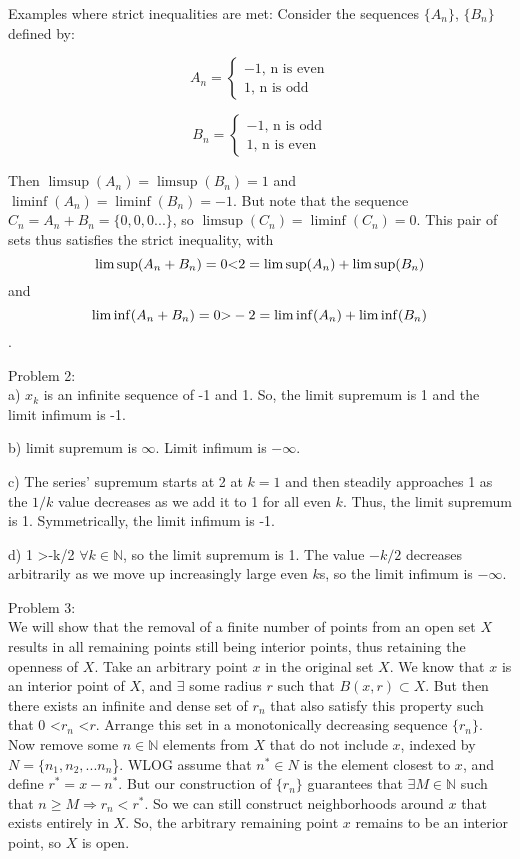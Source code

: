 \documentclass[12pt,leqno]{article}
\begin{document}
\bigskip
Examples where strict inequalities are met: Consider the sequences $\{A_n\}$, $\{B_n\}$ defined by:

$$A_n = \begin{cases}
	-1 \text{, n is even} \\
	1 \text{, n is odd}
\end{cases}$$

$$B_n = \begin{cases}
	-1 \text{, n is odd} \\
	1 \text{, n is even}
\end{cases}$$

Then $\limsup(A_n) = \limsup(B_n) = 1$ and $\liminf(A_n) = \liminf(B_n) = -1$. But note that the sequence $C_n = A_n + B_n = \{0, 0, 0 . . .\}$, so $\limsup(C_n) = \liminf(C_n) = 0$. This pair of sets thus satisfies the strict inequality, with 
$$\limsup(A_n + B_n) = 0 \text{\textless} 2 =  \limsup(A_n) + \limsup(B_n)$$
and
$$\liminf(A_n + B_n) = 0 \text{\textgreater} -2 =  \liminf(A_n) + \liminf(B_n)$$.

\bigskip
\noindent Problem 2:\\
\indent a) $x_k$ is an infinite sequence of -1 and 1. So, the limit supremum is 1 and the limit infimum is -1.

\smallskip
\indent b) limit supremum is $\infty$. Limit infimum is $-\infty$.

\smallskip
\indent c) The series' supremum starts at 2 at $k=1$ and then steadily approaches 1 as the $1/k$ value decreases as we add it to 1 for all even $k$. Thus, the limit supremum is 1. Symmetrically, the limit infimum is -1.

\smallskip
\indent d) 1 \textgreater -k/2 $\forall k \in \mathds{N}$, so the limit supremum is 1. The value $-k/2$ decreases arbitrarily as we move up increasingly large even $k$s, so the limit infimum is $-\infty$.


\bigskip
\noindent Problem 3:\\
\indent We will show that the removal of a finite number of points from an open set $X$ results in all remaining points still being interior points, thus retaining the openness of $X$. Take an arbitrary point $x$ in the original set $X$. We know that $x$ is an interior point of $X$, and $\exists$ some radius $r$ such that $B(x, r) \subset X$. But then there exists an infinite and dense set of $r_n$ that also satisfy this property such that 0 \textless $r_n$ \textless $r$. Arrange this set in a monotonically decreasing sequence $\{r_n\}$. Now remove some $n \in \mathds{N}$ elements from $X$ that do not include $x$, indexed by $N = \{n_1, n_2, . . . n_n$\}. WLOG assume that $n^* \in N$ is the element closest to $x$, and define $r^* = $\textbar $x-n^*$\textbar. But our construction of $\{r_n\}$ guarantees that $\exists M \in \mathds{N}$ such that $n \geq M \Rightarrow r_n<r^*$. So we can still construct neighborhoods around $x$ that exists entirely in $X$. So, the arbitrary remaining point $x$ remains to be an interior point, so $X$ is open.
\end{document}

